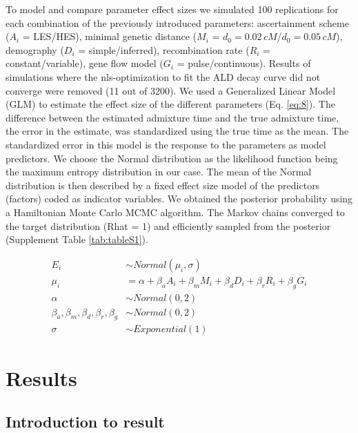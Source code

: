 \documentclass[]{article}
\begin{document}
To model and compare parameter effect sizes we simulated 100
replications for each combination of the previously introduced
parameters: ascertainment scheme ($A_i$ = LES/HES), minimal genetic distance
($M_i$ = \(d_{0}=0.02\,cM\)/\(d_{0}=0.05\,cM\)), demography ($D_i$ = simple/inferred),
recombination rate ($R_i$ = constant/variable), gene flow model
($G_i$ = pulse/continuous). Results of simulations where the nls-optimization to
fit the ALD decay curve did not converge were removed (11 out of 3200).
We used a Generalized Linear Model (GLM)  to estimate the effect
size of the different parameters (Eq.
\ref{eq:8}). The difference between the estimated
admixture time and the true admixture time, the error in the estimate,
was standardized using the true time as the mean. The standardized error in this model is the response to the parameters as model
predictors. We choose the Normal distribution as the likelihood function being the maximum entropy distribution in our case. The mean of the Normal distribution is then described by a fixed effect size model of the predictors (factors) coded as indicator variables. We obtained the posterior probability using a Hamiltonian Monte Carlo MCMC algorithm. The Markov chains converged to the target distribution (Rhat = 1) and efficiently sampled from the posterior (Supplement Table \ref{tab:tableS1}).  

\begin{equation}\label{eq:8}
\begin{split}
E_i &\sim Normal(\mu_i,\sigma) \\
\mu_i &= \alpha + \beta_aA_i + \beta_mM_i + \beta_dD_i + \beta_rR_i + \beta_gG_i \\
\alpha &\sim Normal(0,2) \\
\beta_a,\beta_m,\beta_d,\beta_r,\beta_g &\sim Normal(0,2) \\
\sigma &\sim Exponential(1)
\end{split}
\end{equation}



\section{Results}\label{results}

\subsection{Introduction to result}\label{introduction to result}
\end{document}
